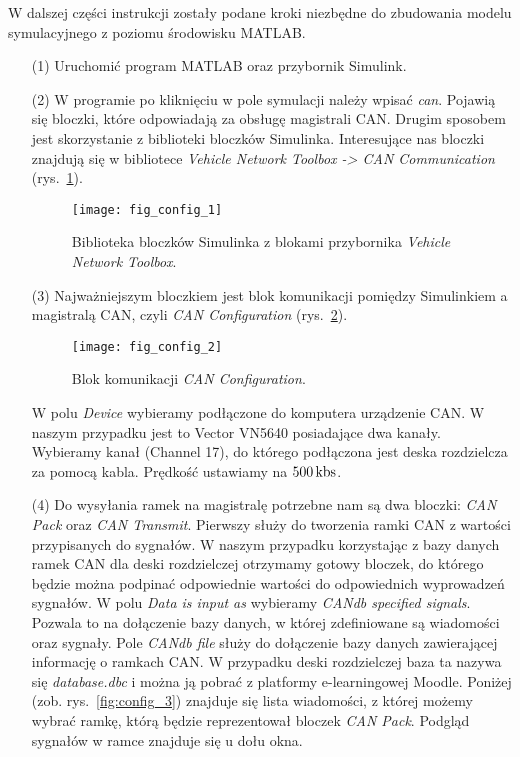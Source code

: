 \documentclass[11pt,onecolumn]{article}
\begin{document}
W dalszej części instrukcji zostały podane kroki niezbędne do zbudowania modelu symulacyjnego z poziomu środowisku MATLAB.
\begin{itemize}
\item[(1)] Uruchomić program MATLAB oraz przybornik Simulink.
%
\item[(2)] W programie po kliknięciu w pole symulacji należy wpisać \emph{can}. Pojawią się bloczki, które odpowiadają za obsługę magistrali CAN. Drugim sposobem jest skorzystanie z biblioteki bloczków Simulinka. Interesujące nas bloczki znajdują się w bibliotece \emph{Vehicle Network Toolbox -> CAN Communication} (rys.~\ref{fig:config_1}).
%
\begin{figure}[!ht]
   \centering
   \texttt{[image: fig\_config\_1]}
   \caption{Biblioteka bloczków Simulinka z blokami przybornika \emph{Vehicle Network Toolbox}.}
   \label{fig:config_1}
\end{figure}
%   
\item[(3)] Najważniejszym bloczkiem jest blok komunikacji pomiędzy Simulinkiem a magistralą CAN, czyli \emph{CAN Configuration} (rys.~\ref{fig:config_2}). 
%
\begin{figure}[!ht]
   \centering
   \texttt{[image: fig\_config\_2]}
   \caption{Blok komunikacji \emph{CAN Configuration}.}
   \label{fig:config_2}
\end{figure}
%
W polu \emph{Device} wybieramy podłączone do komputera urządzenie CAN. W naszym przypadku jest to Vector VN5640 posiadające dwa kanały. Wybieramy kanał (Channel 17), do którego podłączona jest deska rozdzielcza za pomocą kabla. Prędkość ustawiamy na $500 \, {\rm kbs}$.
%
\item[(4)] Do wysyłania ramek na magistralę potrzebne nam są dwa bloczki: \emph{CAN Pack} oraz \emph{CAN Transmit}. Pierwszy służy do tworzenia ramki CAN z wartości przypisanych do sygnałów. W naszym przypadku korzystając z bazy danych ramek CAN dla deski rozdzielczej otrzymamy gotowy bloczek, do którego będzie można podpinać odpowiednie wartości do odpowiednich wyprowadzeń sygnałów. W polu \emph{Data is input as} wybieramy \emph{CANdb specified signals}. Pozwala to na dołączenie bazy danych, w której zdefiniowane są wiadomości oraz sygnały. Pole \emph{CANdb file} służy do dołączenie bazy danych zawierającej informację o ramkach CAN. W przypadku deski rozdzielczej baza ta nazywa się \emph{database.dbc} i można ją pobrać z platformy e-learningowej Moodle. Poniżej (zob. rys.~\ref{fig:config_3}) znajduje się lista wiadomości, z której możemy wybrać ramkę, którą będzie reprezentował bloczek \emph{CAN Pack}. Podgląd sygnałów w ramce znajduje się u dołu okna. 

\end{itemize}
\end{document}

